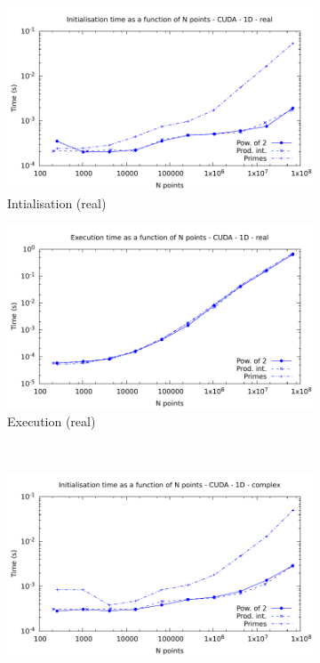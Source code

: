 \documentclass[12pt, a4paper]{article}
\begin{document}
\begin{figure}[H]
\captionsetup{width=0.8\linewidth}
\centering
\begin{subfigure}{.5\textwidth}
\centering
\includegraphics[width=.9\linewidth]{graphs/fft-cuda-1d-pow2-r-init.pdf}
\caption{Intialisation (real)}
\label{FFTCUDA1DRI}
\end{subfigure}%
\begin{subfigure}{.5\textwidth}
\centering
\includegraphics[width=.9\linewidth]{graphs/fft-cuda-1d-pow2-r-exec.pdf}
\caption{Execution (real)}
\label{FFTCUDA1DRE}
\end{subfigure}\\
\begin{subfigure}{.5\textwidth}
\centering
\includegraphics[width=.9\linewidth]{graphs/fft-cuda-1d-pow2-c-init.pdf}

\end{subfigure}
\end{figure}
\end{document}
